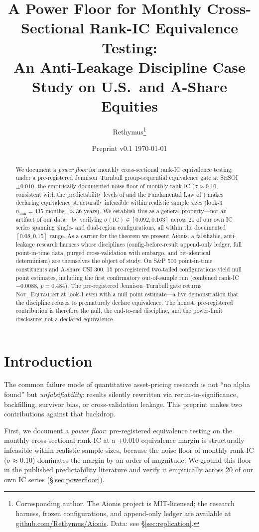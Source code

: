 \documentclass[11pt,a4paper]{article}
\title{A Power Floor for Monthly Cross-Sectional Rank-IC Equivalence Testing:\\
An Anti-Leakage Discipline Case Study on U.S.\ and A-Share Equities}
\author{Rethymus\thanks{Corresponding author. The Aionis project is MIT-licensed; the
research harness, frozen configurations, and append-only ledger are available at
\href{https://github.com/Rethymus/Aionis}{github.com/Rethymus/Aionis}. Data:
see \S\ref{sec:replication}.}}\date{Preprint v0.1 \today}
\begin{document}
\maketitle

\begin{abstract}
We document a \emph{power floor} for monthly cross-sectional rank-IC equivalence
testing: under a pre-registered Jennison--Turnbull group-sequential equivalence
gate at SESOI $\pm 0.010$, the empirically documented noise floor of monthly
rank-IC ($\sigma\!\approx\!0.10$, consistent with the predictability levels of
\citealt{gu2020empirical} and the Fundamental Law of \citealt{grinold1999active})
makes declaring equivalence structurally infeasible within realistic sample sizes
(look-3 $n_{\min}=435$ months, $\approx 36$ years). We establish this as a
general property---not an artifact of our data---by verifying $\sigma(\text{IC})\in[0.092,0.163]$
across 20 of our own IC series spanning single- and dual-region configurations,
all within the documented $[0.08,0.15]$ range. As a carrier for the theorem we
present Aionis, a falsifiable, anti-leakage research harness whose disciplines
(config-before-result append-only ledger, full point-in-time data, purged
cross-validation with embargo, and bit-identical determinism) are themselves the
object of study. On S\&P 500 point-in-time constituents and A-share CSI 300, 15
pre-registered two-tailed configurations yield null point estimates, including
the first confirmatory out-of-sample run (combined rank-IC $-0.0088$, $p=0.484$).
The pre-registered Jennison--Turnbull gate returns \textsc{Not\_Equivalent} at
look-1 even with a null point estimate---a live demonstration that the discipline
refuses to prematurely declare equivalence. The honest, pre-registered contribution
is therefore the null, the end-to-end discipline, and the power-limit disclosure:
not a declared equivalence.
\end{abstract}

\section{Introduction}\label{sec:intro}

The common failure mode of quantitative asset-pricing research is not ``no alpha
found'' but \emph{unfalsifiability}: results silently rewritten via rerun-to-significance,
backfilling, survivor bias, or cross-validation leakage. This preprint makes two
contributions against that backdrop.

First, we document a \emph{power floor}: pre-registered equivalence testing on the
monthly cross-sectional rank-IC at a $\pm 0.010$ equivalence margin is structurally
infeasible within realistic sample sizes, because the noise floor of monthly rank-IC
($\sigma\!\approx\!0.10$) dominates the margin by an order of magnitude. We ground
this floor in the published predictability literature
\citep{gu2020empirical,goyal2008comprehensive,grinold1999active} and verify it
empirically across 20 of our own IC series (\S\ref{sec:powerfloor}).
\end{document}
